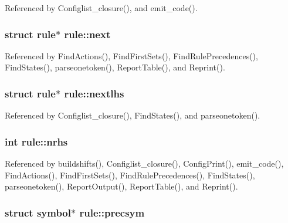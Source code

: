 Referenced by Configlist\-\_\-closure(), and emit\-\_\-code().

\hypertarget{structrule_a9f774bc10d228f1949db6a601ff8e4f9}{
\subsubsection[{next}]{\setlength{\rightskip}{0pt plus 5cm}struct {\bf rule}$\ast$ rule\-::next}}\label{structrule_a9f774bc10d228f1949db6a601ff8e4f9}


Referenced by Find\-Actions(), Find\-First\-Sets(), Find\-Rule\-Precedences(), Find\-States(), parseonetoken(), Report\-Table(), and Reprint().

\hypertarget{structrule_aab6a3ef5170b0d13e36427abb6f40b26}{
\subsubsection[{nextlhs}]{\setlength{\rightskip}{0pt plus 5cm}struct {\bf rule}$\ast$ rule\-::nextlhs}}\label{structrule_aab6a3ef5170b0d13e36427abb6f40b26}


Referenced by Configlist\-\_\-closure(), Find\-States(), and parseonetoken().

\hypertarget{structrule_aa96168d20a55ca25150e6cbd4fe25a58}{
\subsubsection[{nrhs}]{\setlength{\rightskip}{0pt plus 5cm}int rule\-::nrhs}}\label{structrule_aa96168d20a55ca25150e6cbd4fe25a58}


Referenced by buildshifts(), Configlist\-\_\-closure(), Config\-Print(), emit\-\_\-code(), Find\-Actions(), Find\-First\-Sets(), Find\-Rule\-Precedences(), Find\-States(), parseonetoken(), Report\-Output(), Report\-Table(), and Reprint().

\hypertarget{structrule_a4b88c69ede5e1e148b4528ff0c9ccbec}{
\subsubsection[{precsym}]{\setlength{\rightskip}{0pt plus 5cm}struct {\bf symbol}$\ast$ rule\-::precsym}}\label{structrule_a4b88c69ede5e1e148b4528ff0c9ccbec}


